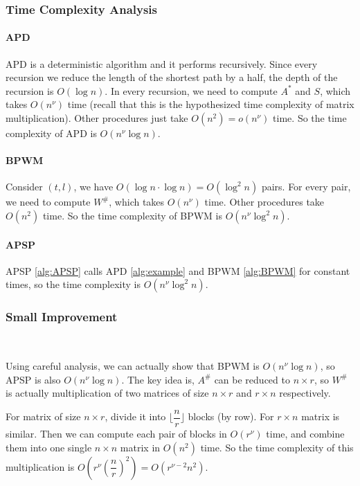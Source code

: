 \documentclass[11pt]{article}
\theoremstyle{plain}
\begin{document}
\subsubsection{Time Complexity Analysis}

\paragraph{APD} APD is a deterministic algorithm and it performs recursively. Since every recursion we reduce the length of the shortest path by a half, the depth of the recursion is $O(\log n)$. In every recursion, we need to compute $A^*$ and $S$, which takes $O(n^{\nu})$ time (recall that this is the hypothesized time complexity of matrix multiplication). Other procedures just take $O(n^2)=o(n^{\nu})$ time. So the time complexity of APD is $O(n^{\nu}\log n)$.

\paragraph{BPWM} Consider $(t,l)$, we have $O(\log n\cdot \log n)=O(\log^2 n)$ pairs. For every pair, we need to compute $W^{\#}$, which takes $O(n^{\nu})$ time. Other procedures take $O(n^2)$ time. So the time complexity of BPWM is $O(n^{\nu}\log^2 n)$.

\paragraph{APSP} APSP \ref{alg:APSP} calls APD \ref{alg:example} and BPWM \ref{alg:BPWM} for constant times, so the time complexity is $O(n^{\nu}\log^2 n)$.

\subsubsection{Small Improvement}
\label{imp}\

Using careful analysis, we can actually show that BPWM is $O(n^\nu \log n)$, so APSP is also $O(n^\nu \log n)$. The key idea is, $A^\#$ can be reduced to $n\times r$, so $W^\#$ is actually multiplication of two matrices of size $n\times r$ and $r\times n$ respectively.

For matrix of size $n\times r$, divide it into $\lfloor\dfrac{n}{r}\rfloor$ blocks (by row). For $r\times n$ matrix is similar. Then we can compute each pair of blocks in $O(r^{\nu})$ time, and combine them into one single $n\times n$ matrix in $O(n^2)$ time. So the time complexity of this multiplication is $O(r^\nu(\dfrac{n}{r})^2)=O(r^{\nu-2}n^2)$.
\end{document}
